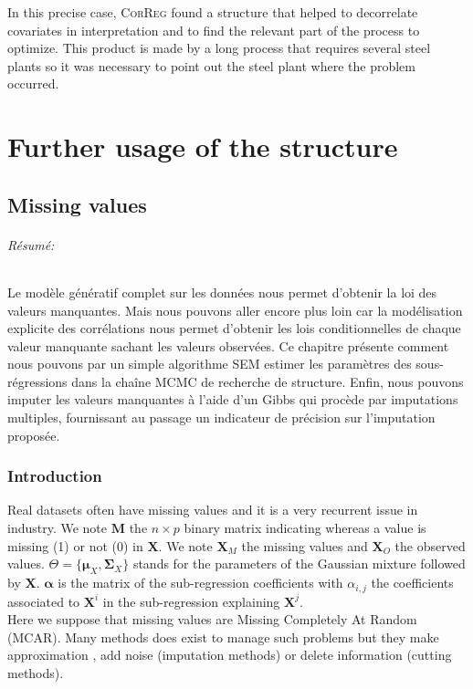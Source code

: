 \documentclass[12pt,a4paper]{report}
\begin{document}
In this precise case, \textsc{CorReg} found a structure that helped to decorrelate covariates in interpretation and to find the relevant part of the process to optimize. This product is made by a long process that requires several steel plants so it was necessary to point out the steel plant where the problem occurred.


\part{Further usage of the structure}	
\chapter{Missing values}
	\paragraph{Résumé:} Le modèle génératif complet sur les données nous permet d'obtenir la loi des valeurs manquantes. Mais nous pouvons aller encore plus loin car la modélisation explicite des corrélations nous permet d'obtenir les lois conditionnelles de chaque valeur manquante sachant les valeurs observées. Ce chapitre présente comment nous pouvons par un simple algorithme SEM estimer les paramètres des sous-régressions dans la chaîne MCMC de recherche de structure. Enfin, nous pouvons imputer les valeurs manquantes à l'aide d'un Gibbs qui procède par imputations multiples, fournissant au passage un indicateur de précision sur l'imputation proposée. 

\section{Introduction}
	Real datasets often have missing values and it is a very recurrent issue in industry. We note $\boldsymbol{M}$ the $n\times p$ binary matrix indicating whereas a value is missing (1) or not (0) in $\boldsymbol{X}$.
	We note $\boldsymbol{X}_M$ the missing values and $\boldsymbol{X}_{O}$ the observed values. $\Theta=\{\boldsymbol{\mu}_X,\boldsymbol{\Sigma}_X \}$ stands for the parameters of the Gaussian mixture followed by $\boldsymbol{X}$.
	$\boldsymbol{\alpha}$ is the matrix of the sub-regression coefficients with $\alpha_{i,j}$ the coefficients associated to $\boldsymbol{X}^i$ in the sub-regression explaining $\boldsymbol{X}^j$.\\ 
			Here we suppose that missing values are Missing Completely At Random (MCAR). 
	 Many methods does exist to manage such problems \cite{little1992regression} but they make approximation , add noise (imputation methods) or delete information (cutting methods).	
	 
\end{document}
